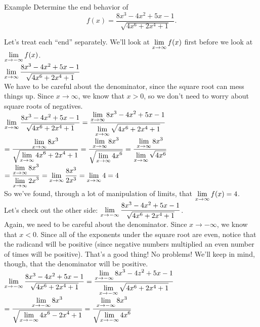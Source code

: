 \begin{note}{Example}
Determine the end behavior of
\[f(x) = \frac{8x^3-4x^2+5x-1}{\sqrt{4x^6+2x^4+1}}.\]

Let's treat each ``end'' separately. We'll look at $\displaystyle \lim_{x\to\infty}f(x)$ first before we look at $\displaystyle \lim_{x\to-\infty}f(x)$.\\

$\displaystyle \lim_{x\to\infty} \frac{8x^3-4x^2+5x-1}{\sqrt{4x^6+2x^4+1}}$\\

We have to be careful about the denominator, since the square root can mess things up. Since $x\to\infty$, we know that $x>0$, so we don't need to worry about square roots of negatives.\\

$\displaystyle \lim_{x\to\infty} \frac{8x^3-4x^2+5x-1}{\sqrt{4x^6+2x^4+1}}= \frac{\displaystyle \lim_{x\to\infty}8x^3-4x^2+5x-1}{\displaystyle \lim_{x\to\infty}\sqrt{4x^6+2x^4+1}}$\\

$= \frac{\displaystyle \lim_{x\to\infty}8x^3}{\sqrt{\displaystyle \lim_{x\to\infty}4x^6+2x^4+1}} =\dfrac{\displaystyle \lim_{x\to\infty}8x^3}{\sqrt{\displaystyle \lim_{x\to\infty}4x^6}} = \dfrac{\displaystyle \lim_{x\to\infty}8x^3}{\displaystyle \lim_{x\to\infty}\sqrt{4x^6}}$\\

$= \dfrac{\displaystyle \lim_{x\to\infty}8x^3}{\displaystyle \lim_{x\to\infty}2x^3} = \displaystyle \lim_{x\to\infty} \dfrac{8x^3}{2x^3} = \displaystyle \lim_{x\to\infty} 4 = 4$\\

So we've found, through a lot of manipulation of limits, that $\displaystyle \lim_{x\to\infty} f(x) = 4$.\\

Let's check out the other side: $\displaystyle \lim_{x\to-\infty} \frac{8x^3-4x^2+5x-1}{\sqrt{4x^6+2x^4+1}}$.\\

Again, we need to be careful about the denominator. Since $x\to-\infty$, we know that $x<0$. Since all of the exponents under the square root are even, notice that the radicand will be positive (since negative numbers multiplied an even number of times will be positive). That's a good thing! No problems! We'll keep in mind, though, that the denominator will be positive.\\

$\displaystyle \lim_{x\to-\infty} \frac{8x^3-4x^2+5x-1}{\sqrt{4x^6+2x^4+1}} = \dfrac{\displaystyle \lim_{x\to-\infty}8x^3-4z^2+5x-1}{\displaystyle \lim_{x\to-\infty}\sqrt{4x^6+2x^4+1}}$\\

$=\dfrac{\displaystyle \lim_{x\to-\infty} 8x^3}{\sqrt{\displaystyle \lim_{x\to-\infty} 4x^6-2x^4+1}} = \dfrac{\displaystyle \lim_{x\to-\infty} 8x^3}{\sqrt{\displaystyle \lim_{x\to-\infty}4x^6}}$


\end{note}

